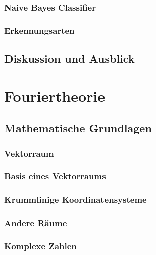 \documentclass[a4paper, 11pt, accentcolor = tud3b]{tudreport}
\begin{document}
			\subsection{Naive Bayes Classifier} %

			\subsection{Erkennungsarten} %

		\section{Diskussion und Ausblick} %

	\chapter{Fouriertheorie} %

		\section{Mathematische Grundlagen} %

			\subsection{Vektorraum} %

			\subsection{Basis eines Vektorraums} %

			\subsection{Krummlinige Koordinatensysteme} %

			\subsection{Andere Räume} %

			\subsection{Komplexe Zahlen} %
\end{document}
